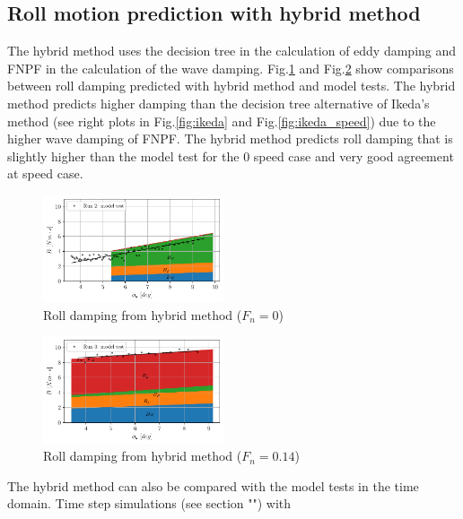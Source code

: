 \subsection*{Roll motion prediction with hybrid
method}\label{roll-motion-prediction-with-hybrid-method}
The hybrid method uses the decision tree in the calculation of eddy
damping and FNPF in the calculation of the wave damping.
Fig.\ref{fig:hybrid_0} and Fig.\ref{fig:hybrid_speed}
show comparisons between roll damping predicted with hybrid method and
model tests. The hybrid method predicts higher damping than the decision
tree alternative of Ikeda's method (see right plots in
Fig.\ref{fig:ikeda} and Fig.\ref{fig:ikeda_speed}) due
to the higher wave damping of FNPF. The hybrid method predicts roll
damping that is slightly higher than the model test for the 0 speed case
and very good agreement at speed case.
\begin{figure}[H]
\begin{center}\includegraphics[width = 0.475\textwidth]{figures/hybrid_0.pdf}\end{center}
\vspace{-0.7cm}
\caption{Roll damping from hybrid method ($F_n = 0$)}
\label{fig:hybrid_0}
\end{figure}
\begin{figure}[H]
\begin{center}\includegraphics[width = 0.475\textwidth]{figures/hybrid_speed.pdf}\end{center}
\vspace{-0.7cm}
\caption{Roll damping from hybrid method ($F_n = 0.14$)}
\label{fig:hybrid_speed}
\end{figure}
The hybrid method can also be compared with the model tests in the time
domain. Time step simulations (see section "") with
